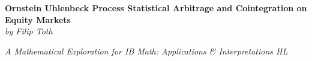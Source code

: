 \documentclass{article}
\begin{document}
\begin{titlepage}
    \vspace*{\fill}
    \vspace*{-4cm}
    \begin{center}
        \huge \textbf { Ornstein Uhlenbeck Process Statistical Arbitrage and Cointegration on Equity Markets } \\
        \vspace{0.5cm}
        \Large \textit { by Filip Toth }
    \end{center}
    \vspace*{\fill}
    \begin{center}
        \large \textit {A Mathematical Exploration for IB Math: Applications \& Interpretations HL}
    \end{center}
\end{titlepage}

\tableofcontents
\newpage
\end{document}
